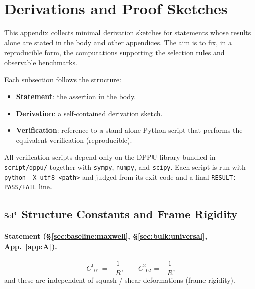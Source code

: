 \section{Derivations and Proof Sketches}
\label{app:E}

This appendix collects minimal derivation sketches for statements whose
results alone are stated in the body and other appendices.  The aim is to
fix, in a reproducible form, the computations supporting the selection
rules and observable benchmarks.

Each subsection follows the structure:

\begin{itemize}
  \item \textbf{Statement}: the assertion in the body.
  \item \textbf{Derivation}: a self-contained derivation sketch.
  \item \textbf{Verification}: reference to a stand-alone Python script that
        performs the equivalent verification (reproducible).
\end{itemize}

All verification scripts depend only on the DPPU library bundled in
\texttt{script/dppu/} together with \texttt{sympy}, \texttt{numpy}, and
\texttt{scipy}.  Each script is run with
\texttt{python -X utf8 <path>} and judged from its exit code and a final
\texttt{RESULT: PASS/FAIL} line.

\subsection{$\mathrm{Sol}^3$ Structure Constants and Frame Rigidity}
\label{app:E:E1}

\paragraph{Statement (\S\ref{sec:baseline:maxwell}, \S\ref{sec:bulk:universal}, App.~\ref{app:A}).}
\begin{equation}
  C^1{}_{01} = +\frac{1}{R}, \qquad C^2{}_{02} = -\frac{1}{R},
\end{equation}
and these are independent of squash / shear deformations (frame rigidity).

